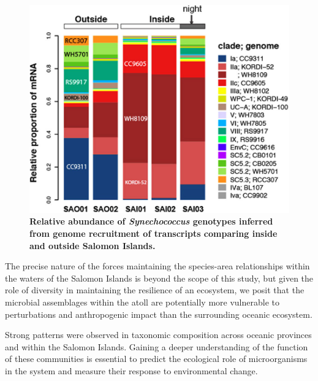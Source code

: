 \begin{figure}
    \centering
    \includegraphics[width=\textwidth]{Chagos/figures/fig6}
    \caption{\textbf{Relative abundance of {\em Synechococcus} genotypes inferred from genome recruitment of transcripts comparing inside and outside Salomon Islands.}}
    \label{Chagos_fig6}
\end{figure}

The precise nature of the forces maintaining the species-area relationships within the waters of the Salomon Islands is beyond the scope of this study, but given the role of diversity in maintaining the resilience of an ecosystem, \cite{elmqvist_response_2003} we posit that the microbial assemblages within the atoll are potentially more vulnerable to perturbations and anthropogenic impact than the surrounding oceanic ecosystem.

Strong patterns were observed in taxonomic composition across oceanic provinces and within the Salomon Islands. Gaining a deeper understanding of the function of these communities is essential to predict the ecological role of microorganisms in the system and measure their response to environmental change.

